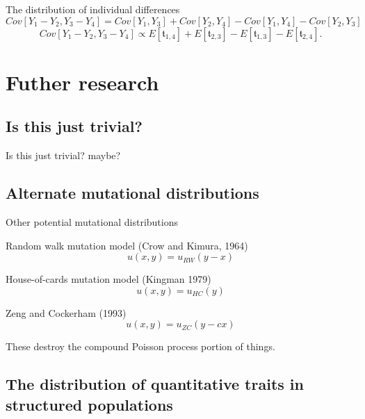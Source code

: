 \documentclass{beamer}
\begin{document}
\begin{frame}{The distribution of individual differences}
  \small
  \begin{equation*}
    \label{eq:cov}
    Cov[Y_1-Y_2,Y_3-Y_4]=Cov[Y_1,Y_3]+Cov[Y_2,Y_4]-Cov[Y_1,Y_4]-Cov[Y_2,Y_3]
  \end{equation*}
  \begin{equation*}
    \label{eq:covcoal}
    Cov[Y_1-Y_2,Y_3-Y_4] \propto E[\mathfrak{t}_{1,4}] + E[\mathfrak{t}_{2,3}] - E[\mathfrak{t}_{1,3}] - E[\mathfrak{t}_{2,4}].
  \end{equation*}
\end{frame}

\section{Futher research}
\subsection{Is this just trivial?}

\begin{frame}{Is this just trivial?}
  maybe?
\end{frame}

\subsection{Alternate mutational distributions}

\begin{frame}{Other potential mutational distributions}
  \begin{block}{Random walk mutation model (Crow and Kimura, 1964)}
    \begin{equation*}
      u(x,y) = u_{RW}(y-x)
    \end{equation*}
  \end{block}
  \begin{block}{House-of-cards mutation model (Kingman 1979)}    
    \begin{equation*}
      u(x,y) = u_{HC}(y)
    \end{equation*}
  \end{block}
  \begin{block}{Zeng and Cockerham (1993)}    
    \begin{equation*}
      u(x,y) = u_{ZC}(y - cx)
    \end{equation*}
  \end{block}
  These destroy the compound Poisson process portion of things.
\end{frame}

\subsection{The distribution of quantitative traits in structured populations}
\end{document}
